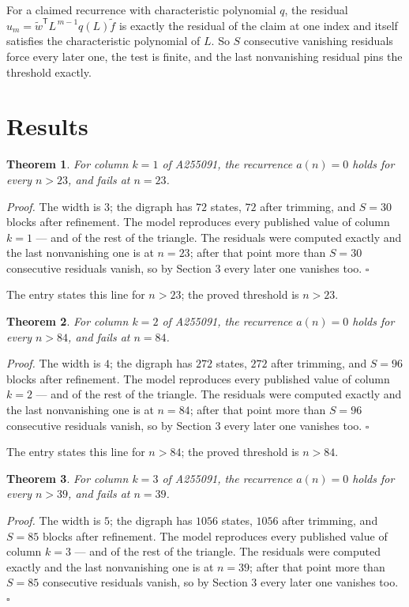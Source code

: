 \documentclass[11pt]{article}
\newtheorem{theorem}{Theorem}
\theoremstyle{definition}
\begin{document}
For a claimed recurrence with characteristic polynomial $q$, the residual $u_m = \tilde w^{\mathsf T}L^{\,m-1}q(L)\tilde f$ is exactly the residual of the claim at one index and itself satisfies the characteristic polynomial of $L$. So $S$ consecutive vanishing residuals force every later one, the test is finite, and the last nonvanishing residual pins the threshold exactly.

\section{Results}

\begin{theorem} For column $k = 1$ of A255091, the recurrence $a(n) = 0$ holds for every $n > 23$, and fails at $n = 23$.\end{theorem}

{\itshape Proof.} The width is $3$; the digraph has $72$ states, $72$ after trimming, and $S = 30$ blocks after refinement. The model reproduces every published value of column $k = 1$ --- and of the rest of the triangle. The residuals were computed exactly and the last nonvanishing one is at $n = 23$; after that point more than $S = 30$ consecutive residuals vanish, so by Section 3 every later one vanishes too. $\square$

The entry states this line for $n > 23$; the proved threshold is $n > 23$.

\begin{theorem} For column $k = 2$ of A255091, the recurrence $a(n) = 0$ holds for every $n > 84$, and fails at $n = 84$.\end{theorem}

{\itshape Proof.} The width is $4$; the digraph has $272$ states, $272$ after trimming, and $S = 96$ blocks after refinement. The model reproduces every published value of column $k = 2$ --- and of the rest of the triangle. The residuals were computed exactly and the last nonvanishing one is at $n = 84$; after that point more than $S = 96$ consecutive residuals vanish, so by Section 3 every later one vanishes too. $\square$

The entry states this line for $n > 84$; the proved threshold is $n > 84$.

\begin{theorem} For column $k = 3$ of A255091, the recurrence $a(n) = 0$ holds for every $n > 39$, and fails at $n = 39$.\end{theorem}

{\itshape Proof.} The width is $5$; the digraph has $1056$ states, $1056$ after trimming, and $S = 85$ blocks after refinement. The model reproduces every published value of column $k = 3$ --- and of the rest of the triangle. The residuals were computed exactly and the last nonvanishing one is at $n = 39$; after that point more than $S = 85$ consecutive residuals vanish, so by Section 3 every later one vanishes too. $\square$
\end{document}
